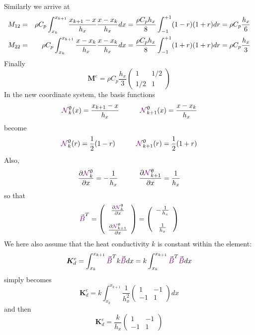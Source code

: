 Similarly we arrive at 
\begin{eqnarray}
M_{12}
&=&\rho C_p 
\int_{x_k}^{x_{k+1}} 
\frac{x_{k+1}-x}{h_x}  
\frac{x-x_k}{h_x}  
dx
=
\frac{\rho C_p  h_x}{8} 
\int_{-1}^{+1} (1-r) (1+r)dr
= \rho C_p\frac{h_x}{6}  \nonumber\\
M_{22}
&=&
\rho C_p 
\int_{x_k}^{x_{k+1}} 
\frac{x-x_k}{h_x}  
\frac{x-x_k}{h_x}  
dx
=
\frac{\rho C_p  h_x}{8} 
\int_{-1}^{+1} (1+r) (1+r)dr
= \rho C_p \frac{h_x}{3} \nonumber 
\end{eqnarray}
Finally 
\[
\boxed{
{\bm M}^e= \rho C_p \frac{h_x}{3}   
\left(
\begin{array}{cc}
1  & 1/2 \\
1/2 & 1
\end{array}
\right)
}
\]
In the new coordinate system, the {\color{olive}basis functions} 
\[
{\color{violet}{\mathcal{N}}}_k^\uptheta(x) = \frac{x_{k+1}-x}{h_x} 
\quad
\quad
\quad
{\color{violet}{\mathcal{N}}}_{k+1}^\uptheta(x) = \frac{x-x_k}{h_x} 
\]
become 
\[
{\color{violet}{\mathcal{N}}}_k^\uptheta(r) = \frac{1}{2} (1-r)
\quad
\quad
\quad
{\color{violet}{\mathcal{N}}}_{k+1}^\uptheta(r) = \frac{1}{2} (1+r)
\]
Also, 
\[
\frac{\partial {\color{violet}{\mathcal{N}}}_k^\uptheta}{\partial x} = - \frac{1}{h_x} 
\quad
\quad
\quad
\frac{\partial {\color{violet}{\mathcal{N}}}_{k+1}^\uptheta}{\partial x} = \frac{1}{h_x} 
\]
so that 
\[
{\vec {\color{violet}B}}^T=
\left(
\begin{array}{cc}
 \frac{\partial {\color{violet}{\mathcal{N}}}_k^\uptheta}{\partial x}   \\ \\
 \frac{\partial {\color{violet}{\mathcal{N}}}_{k+1}^\uptheta}{\partial x}
\end{array}
\right)
=
\left(
\begin{array}{cc}
-\frac{1}{h_x} \\ \\
\frac{1}{h_x} 
\end{array}
\right)
\]
We here also assume that the heat conductivity $k$ is constant within the element:
\[
{\bm K}_d^e =
\int_{x_k}^{x_{k+1}}   {\vec {\color{violet}B}}^T k {\vec {\color{violet}B}} dx 
= k \int_{x_k}^{x_{k+1}}   {\vec {\color{violet}B}}^T {\vec {\color{violet}B}} dx 
\]
simply becomes
\[
{\bm K}_d^e = k
 \int_{x_k}^{x_{k+1}} 
\frac{1}{h_x^2}
\left(
\begin{array}{cc}
1 & -1 \\ -1 & 1
\end{array}
\right)
dx
\]
and then
\[
\boxed{
{\bm K}_d^e =
\frac{k}{h_x}
\left(
\begin{array}{cc}
1 & -1 \\ -1 & 1
\end{array}
\right)
}
\]

